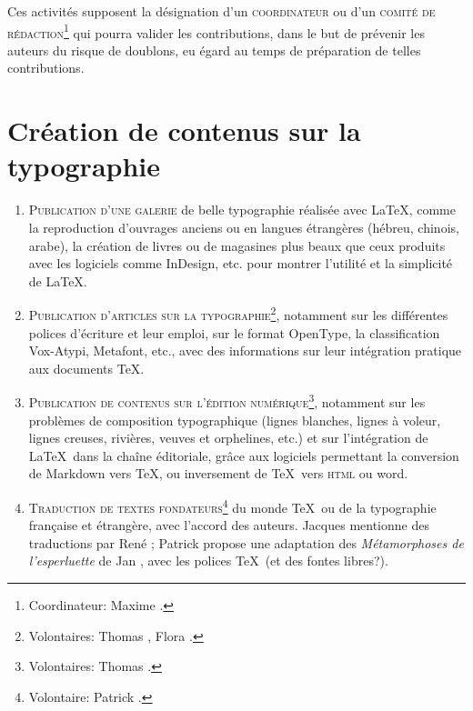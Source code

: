 \documentclass{tufte-handout}
\newcommand{\ratio}[3][]{\marginpar{\footnotesize{\textcolor{teal}{Temps requis: #2 / Utilité: #3}\par\noindent \textcolor{teal}{#1}}}}
\begin{document}
Ces activités supposent la désignation d'un \textsc{coordinateur}\ratio[Potentiellement chronophage]{++}{++} ou d'un \textsc{comité de rédaction}\footnote{Coordinateur: Maxime .} qui pourra valider les contributions, dans le but de prévenir les auteurs du risque de doublons, eu égard au temps de préparation de telles contributions.


\section{Création de contenus sur la typographie}

\begin{enumerate}
	\item\textsc{Publication d'une galerie}\ratio[Les documents existent]{+}{+++} de belle typographie réalisée avec \LaTeX, comme la reproduction d'ouvrages anciens ou en langues étrangères (hébreu, chinois, arabe), la création de livres ou de magasines plus beaux que ceux produits avec les logiciels comme InDesign, etc. pour montrer l'utilité et la simplicité de \LaTeX.
	\item\textsc{Publication d'articles sur la typographie}\ratio[Individuellement assez peu chronophage, d'autant que certaines ressources existent]{++}{++}\footnote{Volontaires: Thomas , Flora .}, notamment sur les différentes polices d'écriture et leur emploi, sur le format OpenType, la classification Vox-Atypi, Metafont, etc., avec des informations sur leur intégration pratique aux documents \TeX.
	\item\textsc{Publication de contenus sur l'édition numérique}\ratio[Individuellement assez peu chronophage, d'autant que certaines ressources existent]{++}{++}\footnote{Volontaires: Thomas .}, notamment sur les problèmes de composition typographique (lignes blanches, lignes à voleur, lignes creuses, rivières, veuves et orphelines, etc.) et sur l'intégration de \LaTeX\ dans la chaîne éditoriale, grâce aux logiciels permettant la conversion de Markdown vers \TeX, ou inversement de \TeX\ vers \textsc{html} ou word.
	\item\textsc{Traduction de textes fondateurs}\ratio[Chronophage]{+++}{+}\footnote{Volontaire: Patrick .} du monde \TeX\ ou de la typographie française et étrangère, avec l'accord des auteurs. Jacques  mentionne des traductions par René ; Patrick  propose une adaptation des \emph{Métamorphoses de l'esperluette} de Jan , avec les polices \TeX~(et des fontes libres?).
\end{enumerate}
\end{document}

